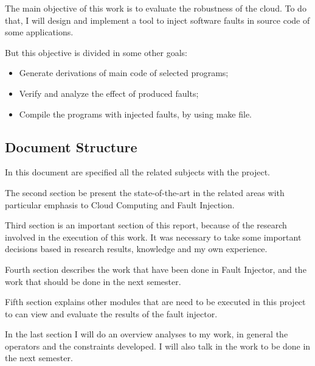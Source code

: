 The main objective of this work is to evaluate the robustness of the cloud. To do that, I will design and implement a tool to inject software faults in source code of some applications.

But this objective is divided in some other goals:

\begin{itemize}
	\item Generate derivations of main code of selected programs;
	\item Verify and analyze the effect of produced faults;
	\item Compile the programs with injected faults, by using make file.
\end{itemize}


\subsection{Document Structure}

In this document are specified all the related subjects with the project.

The second section be present the state-of-the-art in the related areas with particular emphasis to Cloud Computing and Fault Injection.

Third section is an important section of this report, because of the research involved in the execution of this work. It was necessary to take some important decisions based in research results, knowledge and my own experience.

Fourth section describes the work that have been done in Fault Injector, and the work that should be done in the next semester.

Fifth section explains other modules that are need to be executed in this project to can view and evaluate the results of the fault injector.

In the last section I will do an overview analyses to my work, in general the operators and the constraints developed. I will also talk in the work to be done in the next semester.

